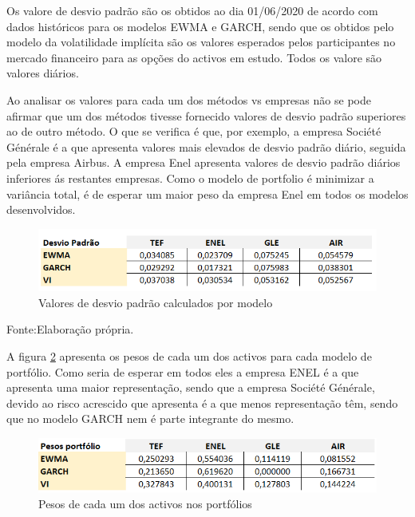 \documentclass[
  12pt,
  a4paper,
  openany]{book}
\begin{document}
Os valore de desvio padrão são os obtidos ao dia 01/06/2020 de acordo com dados históricos para os modelos EWMA e GARCH, sendo que os obtidos pelo modelo da volatilidade implícita são os valores esperados pelos participantes no mercado financeiro para as opções do activos em estudo. Todos os valore são valores diários.

Ao analisar os valores para cada um dos métodos vs empresas não se pode afirmar que um dos métodos tivesse fornecido valores de desvio padrão superiores ao de outro método. O que se verifica é que, por exemplo, a empresa Société Générale é a que apresenta valores mais elevados de desvio padrão diário, seguida pela empresa Airbus. A empresa Enel apresenta valores de desvio padrão diários inferiores ás restantes empresas. Como o modelo de portfolio é minimizar a variância total, é de esperar um maior peso da empresa Enel em todos os modelos desenvolvidos.

\begin{figure}

{\centering \includegraphics[width=0.8\linewidth]{image/desvio} 

}

\caption{Valores de desvio padrão calculados por modelo}\label{fig:umdesvio}
\end{figure}
\FloatBarrier
\centering

Fonte:Elaboração própria.

\justifying
\bigskip

A figura \ref{fig:umpeso} apresenta os pesos de cada um dos activos para cada modelo de portfólio. Como seria de esperar em todos eles a empresa ENEL é a que apresenta uma maior representação, sendo que a empresa Société Générale, devido ao risco acrescido que apresenta é a que menos representação têm, sendo que no modelo GARCH nem é parte integrante do mesmo.

\begin{figure}

{\centering \includegraphics[width=0.8\linewidth]{image/pesos} 

}

\caption{Pesos de cada um dos activos nos portfólios}\label{fig:umpeso}
\end{figure}
\FloatBarrier
\centering
\end{document}
